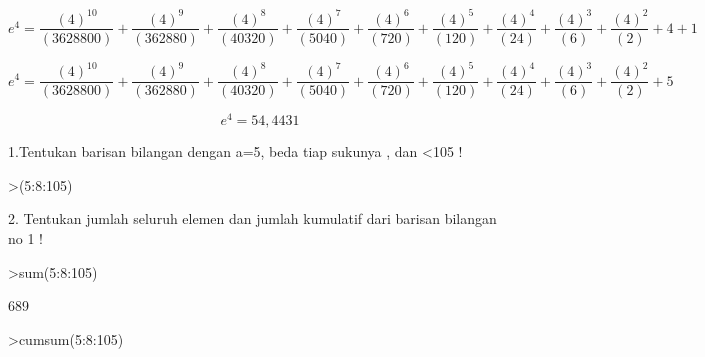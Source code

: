 \documentclass[a4paper,10pt]{article}
\begin{document}
\begin{eulernotebook}
\begin{eulercomment}
\begin{eulercomment}
\begin{eulercomment}
\begin{eulercomment}
\begin{eulercomment}
\end{eulercomment}
\begin{eulerformula}
\[
e^4 = \frac{(4)^{10}}{(3628800)} + \frac{(4)^{9}}{(362880)} + \frac{(4)^{8}}{(40320)} + \frac{(4)^{7}}{(5040)} + \frac{(4)^{6}}{(720)} + \frac{(4)^{5}}{(120)} + \frac{(4)^{4}}{(24)} + \frac{(4)^{3}}{(6)} + \frac{(4)^{2}}{(2)} + 4 + 1
\]
\end{eulerformula}
\begin{eulercomment}
\end{eulercomment}
\begin{eulerformula}
\[
e^4 = \frac{(4)^{10}}{(3628800)} + \frac{(4)^{9}}{(362880)} + \frac{(4)^{8}}{(40320)} + \frac{(4)^{7}}{(5040)} + \frac{(4)^{6}}{(720)} + \frac{(4)^{5}}{(120)} + \frac{(4)^{4}}{(24)} + \frac{(4)^{3}}{(6)} + \frac{(4)^{2}}{(2)} + 5
\]
\end{eulerformula}
\begin{eulercomment}
\end{eulercomment}
\begin{eulerformula}
\[
e^4 = 54,4431
\]
\end{eulerformula}
\begin{eulercomment}
\end{eulercomment}
\begin{eulercomment}
1.Tentukan barisan bilangan dengan a=5, beda tiap sukunya , dan \textless{}105 !
\end{eulercomment}
\begin{eulerprompt}
>(5:8:105)
\end{eulerprompt}
\begin{euleroutput}
  [5,  13,  21,  29,  37,  45,  53,  61,  69,  77,  85,  93,  101]
\end{euleroutput}
\begin{eulercomment}
2. Tentukan jumlah seluruh elemen dan jumlah kumulatif dari barisan
bilangan no 1 !
\end{eulercomment}
\begin{eulerprompt}
>sum(5:8:105)
\end{eulerprompt}
\begin{euleroutput}
  689
\end{euleroutput}
\begin{eulerprompt}
>cumsum(5:8:105)
\end{eulerprompt}
\begin{euleroutput}
  [5,  18,  39,  68,  105,  150,  203,  264,  333,  410,  495,  588,  689]
\end{euleroutput}

\end{eulercomment}
\end{eulercomment}
\end{eulercomment}
\end{eulercomment}
\end{eulernotebook}
\end{document}
